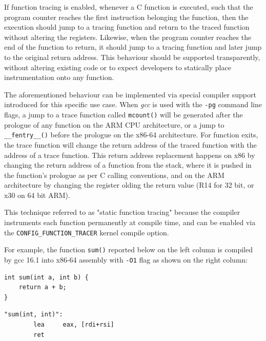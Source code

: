 If function tracing is enabled, whenever a C function is executed, such that
the program counter reaches the first instruction belonging the function, then
the execution should jump to a tracing function and return to the traced
function without altering the registers. Likewise, when the program counter
reaches the end of the function to return, it should jump to a tracing function
and later jump to the original return address. This behaviour should be
supported transparently, without altering existing code or to expect developers
to statically place instrumentation onto any function.

The aforementioned behaviour can be implemented via special compiler support
introduced for this specific use case. When \textit{gcc} is used with the
\verb|-pg| command line flags, a jump to a trace function called \verb|mcount()|
will be generated after the prologue of any function on the ARM CPU
architecture, or a jump to \verb|__fentry__()| before the prologue on the x86-64
architecture. For function exits, the trace function will change the return
address of the traced function with the address of a trace function. This return
address replacement happens on x86 by changing the return address of a function
from the stack, where it is pushed in the function's prologue as per C calling
conventions, and on the ARM architecture by changing the register olding the
return value (R14 for 32 bit, or x30 on 64 bit ARM).

This technique referred to as "static function tracing" because the compiler
instruments each function permanently at compile time, and can be enabled via
the \verb|CONFIG_FUNCTION_TRACER| kernel compile option.

For example, the function \verb|sum()| reported below on the left column is
compiled by gcc 16.1 into x86-64 assembly with \verb|-O1| flag as shown on the
right column:

\noindent
\vspace{0.5em}

\begin{minipage}[t]{0.47\textwidth}
\begin{verbatim}
int sum(int a, int b) {
    return a + b;
}
\end{verbatim}
\end{minipage}%
\hfill
\vrule %
\hfill
\begin{minipage}[t]{0.47\textwidth}
\begin{verbatim}
"sum(int, int)":
        lea     eax, [rdi+rsi]
        ret
\end{verbatim}
\end{minipage}

